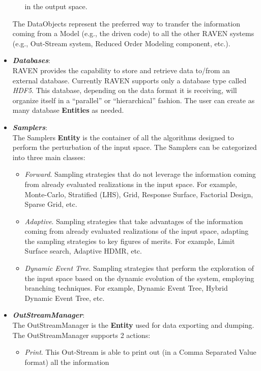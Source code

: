 \begin{itemize}
\begin{itemize}
                                               in the output space.
     \end{itemize}
     The DataObjects represent the preferred way to transfer the information coming from a Model (e.g., the driven code) to
      all the other RAVEN systems (e.g., Out-Stream system, Reduced Order Modeling component, etc.). 
  \item \textit{\textbf{Databases}}:
      \\ RAVEN provides the capability to store and retrieve data to/from an external database. Currently RAVEN supports
       only a database type called \textit{HDF5}. This database, depending on the data format it is receiving, will 
       organize itself in a ``parallel'' or ``hierarchical'' fashion. The user can create as many database \textbf{Entities} as needed. 
  \item \textit{\textbf{Samplers}}:
  \\ The Samplers  \textbf{Entity} is the container of all the algorithms designed to perform the perturbation of the input space.
      The Samplers can be categorized into three main classes:
      \begin{itemize}
        \item  \textit{Forward}. Sampling strategies that do not leverage the information coming from already evaluated 
        realizations in the input space. For example, Monte-Carlo, Stratified (LHS), Grid, Response Surface, Factorial Design, 
        Sparse Grid, etc.
        \item  \textit{Adaptive}. Sampling strategies that take advantages of the information coming from already evaluated 
        realizations of the input space, adapting the sampling strategies to key figures of merits. For example, Limit Surface 
        search, Adaptive HDMR, etc.
        \item \textit{Dynamic Event Tree}. Sampling strategies that perform the exploration of the input space based on the 
        dynamic evolution of the system, employing branching techniques. For example, Dynamic Event Tree, Hybrid 
        Dynamic Event Tree, etc.
      \end{itemize}
  \item \textit{\textbf{OutStreamManager}}:
  \\ The OutStreamManager is the \textbf{Entity} used  for data exporting and dumping. The OutStreamManager supports
   2 actions:
      \begin{itemize}
       \item \textit{Print}. This Out-Stream is able to print out (in a Comma Separated Value format) all the information 

\end{itemize}
\end{itemize}
